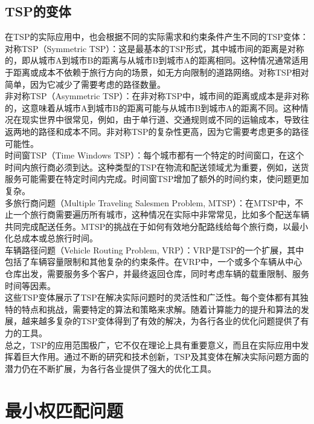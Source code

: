 \documentclass{NauThesis}
\begin{document}
\subsection{TSP的变体}
在TSP的实际应用中，也会根据不同的实际需求和约束条件产生不同的TSP变体：
\\\hspace*{2em}对称TSP（Symmetric TSP）：这是最基本的TSP形式，其中城市间的距离是对称的，即从城市A到城市B的距离与从城市B到城市A的距离相同。这种情况通常适用于距离或成本不依赖于旅行方向的场景，如无方向限制的道路网络。对称TSP相对简单，因为它减少了需要考虑的路径数量。
\\\hspace*{2em}非对称TSP（Asymmetric TSP）：在非对称TSP中，城市间的距离或成本是非对称的，这意味着从城市A到城市B的距离可能与从城市B到城市A的距离不同。这种情况在现实世界中很常见，例如，由于单行道、交通规则或不同的运输成本，导致往返两地的路径和成本不同。非对称TSP的复杂性更高，因为它需要考虑更多的路径可能性。
\\\hspace*{2em}时间窗TSP（Time Windows TSP）：每个城市都有一个特定的时间窗口，在这个时间内旅行商必须到达。这种类型的TSP在物流和配送领域尤为重要，例如，送货服务可能需要在特定时间内完成。时间窗TSP增加了额外的时间约束，使问题更加复杂。
\\\hspace*{2em}多旅行商问题（Multiple Traveling Salesmen Problem, MTSP）：在MTSP中，不止一个旅行商需要遍历所有城市，这种情况在实际中非常常见，比如多个配送车辆共同完成配送任务。MTSP的挑战在于如何有效地分配路线给每个旅行商，以最小化总成本或总旅行时间。
\\\hspace*{2em}车辆路径问题（Vehicle Routing Problem, VRP）：VRP是TSP的一个扩展，其中包括了车辆容量限制和其他复杂的约束条件。在VRP中，一个或多个车辆从中心仓库出发，需要服务多个客户，并最终返回仓库，同时考虑车辆的载重限制、服务时间等因素。
\\\hspace*{2em}这些TSP变体展示了TSP在解决实际问题时的灵活性和广泛性。每个变体都有其独特的特点和挑战，需要特定的算法和策略来求解。随着计算能力的提升和算法的发展，越来越多复杂的TSP变体得到了有效的解决，为各行各业的优化问题提供了有力的工具。
\\\hspace*{2em}总之，TSP的应用范围极广，它不仅在理论上具有重要意义，而且在实际应用中发挥着巨大作用。通过不断的研究和技术创新，TSP及其变体在解决实际问题方面的潜力仍在不断扩展，为各行各业提供了强大的优化工具。
\section{最小权匹配问题}
\end{document}
